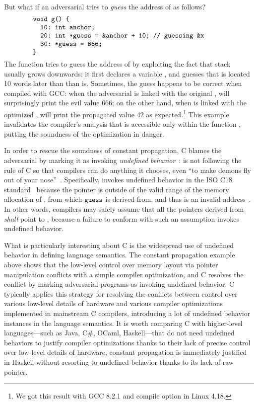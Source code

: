 But what if an adversarial  tries to \emph{guess} the address of  as follows?
%
\[
\begin{minipage}{0.8\textwidth}
\begin{verbatim}
void g() {
  10: int anchor;
  20: int *guess = &anchor + 10; // guessing &x
  30: *guess = 666;
}
\end{verbatim}
\end{minipage}
\]
%
\noindent The function  tries to guess the address of  by exploiting the fact that
stack usually grows downwards: it first declares a variable , and guesses that 
is located 10 words later than than  is.  Sometimes, the guess happens to be correct
when compiled with GCC: when the adversarial  is linked with the original ,
 will surprisingly print the evil value 666; on the other hand, when  is linked
with the optimized ,  will print the propagated value 42 as
expected.\footnote{We got this result with GCC 8.2.1 and compile option 
  in Linux 4.18.} This example invalidates the compiler's analysis that  is accessible only
within the function , putting the soundness of the optimization in danger.

In order to rescue the soundness of constant propagation, C blames the adversarial  by
marking it as invoking \emph{undefined behavior}~\cite{undefined-behavior}:  is not
following the rule of C so that compilers can do anything it chooses, even ``to make demons fly out
of your nose''~\cite{nasal-demons}.  Specifically,  invokes undefined behavior in the ISO
C18 standard~\cite{c18} because the pointer  is outside of the valid range of the memory
allocation of , from which $\texttt{guess}$ is derived from, and thus  is an
invalid address~\cite{c11-6.5.6p8}.  In other words, compilers may safely assume that all the
pointers derived from  \emph{shall} point to , because a failure to
conform with such an assumption invokes undefined behavior.

What is particularly interesting about C is the widespread use of undefined behavior in defining
language semantics.  The constant propagation example above shows that the low-level control over
memory layout via pointer manipulation conflicts with a simple compiler optimization, and C resolves
the conflict by marking adversarial programs as invoking undefined behavior.  C typically applies
this strategy for resolving the conflicts between control over various low-level details of hardware
and various compiler optimizations implemented in mainstream C compilers, introducing a lot of
undefined behavior instances in the language semantics.  It is worth comparing C with higher-level
languages---such as Java, C\#, OCaml, Haskell---that do not need undefined behaviors to justify
compiler optimizations thanks to their lack of precise control over low-level details of hardware,
\eg{} constant propagation is immediately justified in Haskell without resorting to undefined
behavior thanks to its lack of raw pointer.


